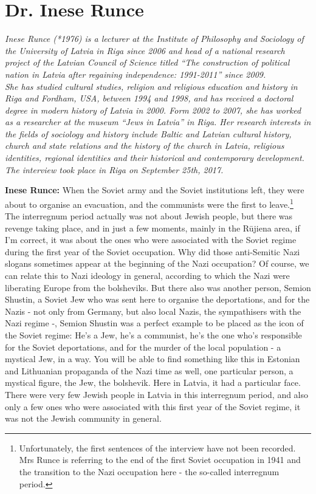 \section{Dr. Inese Runce}

\textit{Inese Runce (*1976) is a lecturer at the Institute of Philosophy and Sociology of the University of Latvia in Riga since 2006 and head of a national research project of the Latvian  Council of Science titled ``The construction  of political nation in Latvia after regaining independence: 1991-2011'' since 2009.\\
She has studied cultural studies, religion and religious education and history in Riga and Fordham, USA, between 1994 and 1998, and has received a doctoral degree in modern history of Latvia in 2000. Form 2002 to 2007, she has worked as a researcher at the museum ``Jews in Latvia'' in Riga. Her research interests in the fields of sociology and history include Baltic and Latvian cultural history, church and state relations and the history of the church in Latvia, religious identities, regional identities and their historical and contemporary development.\\
The interview took place in Riga on September 25th, 2017.}\par
\vspace*{2em}
\textbf{Inese Runce:} When the Soviet army and the Soviet institutions left, they were about to organise an evacuation, and the communists were the first to leave.\footnote{Unfortunately, the first sentences of the interview have not been recorded. Mrs Runce is referring to the end of the first Soviet occupation in 1941 and the transition to the Nazi occupation here - the so-called interregnum period.}\\
The interregnum period actually was not about Jewish people, but there was revenge taking place, and in just a few moments, mainly in the Rūjiena area, if I'm correct, it was about the ones who were associated with the Soviet regime during the first year of the Soviet occupation. Why did those anti-Semitic Nazi slogans sometimes appear at the beginning of the Nazi occupation? Of course, we can relate this to Nazi ideology in general, according to which the Nazi were liberating Europe from the bolsheviks. But there also was another person, Semion Shustin, a Soviet Jew who was sent here to organise the  deportations, and for the Nazis - not only from Germany, but also local Nazis, the sympathisers with the Nazi regime -, Semion Shustin was a perfect example to be placed as the icon of the Soviet regime: He's a Jew, he's a communist, he's the one who's responsible for the Soviet deportations, and for the murder of the local population - a mystical Jew, in a way. You will be able to find something like this in Estonian and Lithuanian propaganda of the Nazi time as well, one particular person, a mystical figure, the Jew, the bolshevik. Here in Latvia, it had a particular face. There were very few Jewish people in Latvia in this interregnum period, and also only a few ones who were associated with this first year of the Soviet regime, it was not the Jewish community in general.
	
